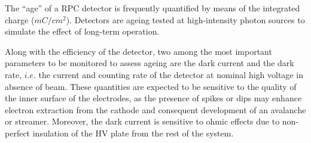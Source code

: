 The “age” of a RPC detector is frequently quantified by means of the integrated charge ($mC/cm^2$). 
Detectors are ageing tested at high-intensity photon sources to simulate the effect of long-term operation.



Along with the efficiency of the detector, two among the most important parameters to be monitored to assess ageing are the dark current and the dark rate, $i.e.$ the current and counting rate of the detector at nominal high voltage in absence of beam.
These quantities are expected to be sensitive to the quality of the inner surface of the electrodes, as the presence of spikes or dips may enhance electron extraction from the cathode and consequent development of an avalanche or streamer.
Moreover, the dark current is sensitive to ohmic effects due to non-perfect insulation of the HV plate from the rest of the system.


